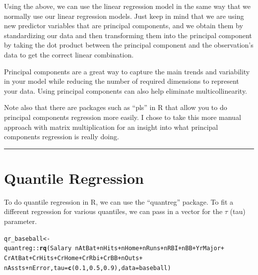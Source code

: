 \documentclass{article}\usepackage[]{graphicx}\usepackage[]{color}
\makeatletter
\newcommand{\hlnum}[1]{\textcolor[rgb]{0.686,0.059,0.569}{#1}}%
\newcommand{\hlopt}[1]{\textcolor[rgb]{0,0,0}{#1}}%
\newcommand{\hlstd}[1]{\textcolor[rgb]{0.345,0.345,0.345}{#1}}%
\newcommand{\hlkwb}[1]{\textcolor[rgb]{0.69,0.353,0.396}{#1}}%
\newcommand{\hlkwc}[1]{\textcolor[rgb]{0.333,0.667,0.333}{#1}}%
\newcommand{\hlkwd}[1]{\textcolor[rgb]{0.737,0.353,0.396}{\textbf{#1}}}%
\newenvironment{kframe}{%
 \def\at@end@of@kframe{}%
 \ifinner\ifhmode%
  \def\at@end@of@kframe{\end{minipage}}%
  \begin{minipage}{\columnwidth}%
 \fi\fi%
 \def\FrameCommand##1{\hskip\@totalleftmargin \hskip-\fboxsep
 \colorbox{shadecolor}{##1}\hskip-\fboxsep
     \hskip-\linewidth \hskip-\@totalleftmargin \hskip\columnwidth}%
 \MakeFramed {\advance\hsize-\width
   \@totalleftmargin\z@ \linewidth\hsize
   \@setminipage}}%
 {\par\unskip\endMakeFramed%
 \at@end@of@kframe}
\newenvironment{knitrout}{}{} %
\makeatother
\begin{document}
Using the above, we can use the linear regression model in the same way that we normally use our linear regression models. Just keep in mind that we are using new predictor variables that are principal components, and we obtain them by standardizing our data and then transforming them into the principal component by taking the dot product between the principal component and the observation's data to get the correct linear combination.

Principal components are a great way to capture the main trends and variability in your model while reducing the number of required dimensions to represent your data. Using principal components can also help eliminate multicollinearity.

Note also that there are packages such as ``pls'' in R that allow you to do principal components regression more easily. I chose to take this more manual approach with matrix multiplication for an insight into what principal components regression is really doing.

\bigskip
\hrule
\bigskip

\section*{Quantile Regression}

To do quantile regression in R, we can use the ``quantreg'' package. To fit a different regression for various quantiles, we can pass in a vector for the $\tau$ (tau) parameter.

\begin{knitrout}
\color{fgcolor}\begin{kframe}
\begin{alltt}
\hlstd{qr_baseball} \hlkwb{<-} \hlstd{quantreg}\hlopt{::}\hlkwd{rq}\hlstd{(Salary} \hlopt{~} \hlstd{nAtBat} \hlopt{+} \hlstd{nHits} \hlopt{+} \hlstd{nHome} \hlopt{+} \hlstd{nRuns} \hlopt{+} \hlstd{nRBI} \hlopt{+} \hlstd{nBB} \hlopt{+} \hlstd{YrMajor} \hlopt{+}
                            \hlstd{CrAtBat} \hlopt{+} \hlstd{CrHits} \hlopt{+} \hlstd{CrHome} \hlopt{+} \hlstd{CrRbi} \hlopt{+} \hlstd{CrBB} \hlopt{+} \hlstd{nOuts} \hlopt{+}
                            \hlstd{nAssts} \hlopt{+} \hlstd{nError,} \hlkwc{tau} \hlstd{=} \hlkwd{c}\hlstd{(}\hlnum{0.1}\hlstd{,} \hlnum{0.5}\hlstd{,} \hlnum{0.9}\hlstd{),} \hlkwc{data} \hlstd{= baseball)}
\end{alltt}
\end{kframe}
\end{knitrout}
\end{document}
